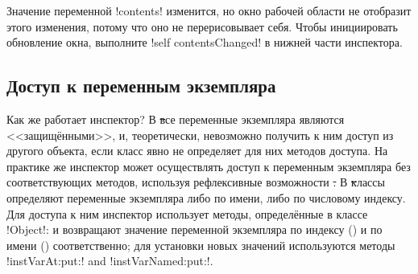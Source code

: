 \documentclass[a4paper,10pt,twoside]{book}
\begin{document}
Значение переменной \ct!contents! изменится, но окно рабочей области не отобразит этого изменения, потому что оно не перерисовывает себя.
Чтобы инициировать обновление окна, выполните \ct!self contentsChanged! в нижней части инспектора.

\subsection{Доступ к переменным экземпляра}

Как же работает инспектор?
В \st все переменные экземпляра являются <<защищёнными>>,
и, теоретически, невозможно получить к ним доступ из другого объекта, если класс явно не определяет для них методов доступа.
На практике же инспектор может осуществлять доступ к переменным экземпляра без соответствующих методов, используя рефлексивные возможности \st.
В \st классы определяют переменные экземпляра либо по имени, либо по числовому индексу.
Для доступа к ним инспектор использует методы, определённые в классе \ct!Object!:  и  возвращают значение переменной экземпляра по индексу () и по имени () соответственно; для установки новых значений используются методы \ct!instVarAt:put:! and \ct!instVarNamed:put:!.
\end{document}
